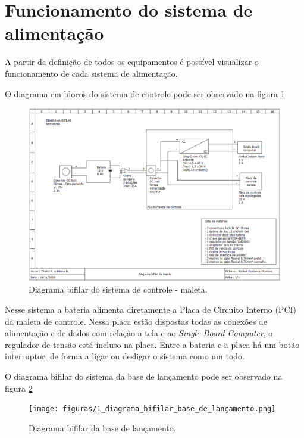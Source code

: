 \section{Funcionamento do sistema de alimentação}

\par A partir da definição de todos os equipamentos é possível visualizar o funcionamento de cada sistema de alimentação.  

\par O diagrama em blocos do sistema de controle pode ser observado na figura \ref{fig:bifilarmaleta}

\begin{figure}[H]
	\centering
		\includegraphics[keepaspectratio=true,scale=0.6]{figuras/1_diagrama_bifilar_da_maleta.png}
	\caption{Diagrama bifilar do sistema de controle - maleta.}
	\label{fig:bifilarmaleta}
\end{figure}

\par Nesse sistema a bateria alimenta diretamente a Placa de Circuito Interno (PCI) da maleta de controle. Nessa placa estão dispostas todas as conexões de alimentação e de dados com relação a tela e ao \textit{Single Board Computer}, o regulador de tensão está incluso na placa. Entre a bateria e a placa há um botão interruptor, de forma a ligar ou desligar o sistema como um todo.

\par O diagrama bifilar do sistema da base de lançamento pode ser observado na figura \ref{fig:bifilarbase}

\begin{figure}[!h]
	\centering
		\texttt{[image: figuras/1\_diagrama\_bifilar\_base\_de\_lançamento.png]}
	\caption{Diagrama bifilar da base de lançamento.}
	\label{fig:bifilarbase}
\end{figure}

